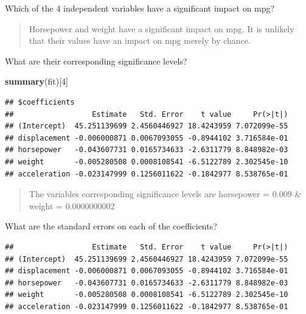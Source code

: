 \documentclass[]{article}
\newenvironment{Shaded}{\begin{snugshade}}{\end{snugshade}}
\newcommand{\KeywordTok}[1]{\textcolor[rgb]{0.13,0.29,0.53}{\textbf{{#1}}}}
\newcommand{\DecValTok}[1]{\textcolor[rgb]{0.00,0.00,0.81}{{#1}}}
\newcommand{\NormalTok}[1]{{#1}}
\begin{document}
\newpage

Which of the 4 independent variables have a significant impact on mpg?

\begin{quote}
Horsepower and weight have a significant impact on mpg. It is unlikely
that their values have an impact on mpg merely by chance.
\end{quote}

What are their corresponding significance levels?

\begin{Shaded}
\begin{Highlighting}[]
\KeywordTok{summary}\NormalTok{(fit)[}\DecValTok{4}\NormalTok{]}
\end{Highlighting}
\end{Shaded}

\begin{verbatim}
## $coefficients
##                  Estimate   Std. Error    t value     Pr(>|t|)
## (Intercept)  45.251139699 2.4560446927 18.4243959 7.072099e-55
## displacement -0.006000871 0.0067093055 -0.8944102 3.716584e-01
## horsepower   -0.043607731 0.0165734633 -2.6311779 8.848982e-03
## weight       -0.005280508 0.0008108541 -6.5122789 2.302545e-10
## acceleration -0.023147999 0.1256011622 -0.1842977 8.538765e-01
\end{verbatim}

\begin{quote}
The variables corresponding significance levels are horsepower =
\(0.009\) \& weight = \(0.0000000002\)
\end{quote}

What are the standard errors on each of the coefficients?

\begin{Shaded}
\end{Shaded}

\begin{verbatim}
##                  Estimate   Std. Error    t value     Pr(>|t|)
## (Intercept)  45.251139699 2.4560446927 18.4243959 7.072099e-55
## displacement -0.006000871 0.0067093055 -0.8944102 3.716584e-01
## horsepower   -0.043607731 0.0165734633 -2.6311779 8.848982e-03
## weight       -0.005280508 0.0008108541 -6.5122789 2.302545e-10
## acceleration -0.023147999 0.1256011622 -0.1842977 8.538765e-01
\end{verbatim}
\end{document}
